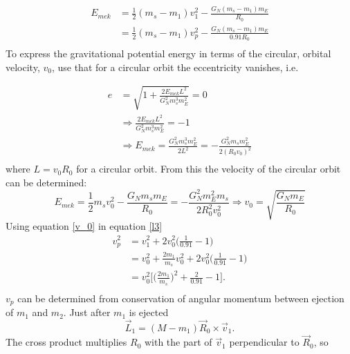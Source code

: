 \begin{example}
\begin{enumerate}
		\begin{equation}
			\begin{split}
				E_{mek}&= \frac{1}{2}(m_s-m_1)v_1^2-\frac{G_N(m_s-m_1)m_E}{R_0}\\
				&=\frac{1}{2}(m_s-m_1)v_p^2-\frac{G_N(m_s-m_1)m_E}{0.91R_0}\\
			\end{split}
			\label{l3}
		\end{equation} 
		To express the gravitational potential energy in terms of the circular, orbital velocity, $v_0$, use that for a circular orbit the eccentricity vanishes,  i.e.
		
		\begin{equation}
			\begin{split}
				e&=\sqrt{1+\frac{2E_{mek}L^2}{G_N^2m_s^3m_E^2}}=0\\
				&\Rightarrow \frac{2E_{mek}L^2}{G_N^2m_s^3m_E^2}=-1\\
				&\Rightarrow E_{mek}=\frac{G_N^2m_s^3m_E^2}{2L^2}=-\frac{G_N^2m_sm_E^2}{2(R_0v_0)^2}\\
			\end{split}
		\end{equation} 
		\normalsize
		where $L=v_0R_0$ for a circular orbit. From this the velocity of the circular orbit can be determined:
		\begin{equation}
			E_{mek}=\frac{1}{2}m_sv_0^2-\frac{G_Nm_sm_E}{R_0}=-\frac{G_N^2m_E^2m_s}{2R_0^2v_0^2}\Rightarrow v_0=\sqrt{\frac{G_Nm_E}{R_0}}
			\label{v_0}
		\end{equation} 
		Using equation \eqref{v_0} in equation \eqref{l3}
		\begin{equation}
			\begin{split}
				v_p^2&=v_1^2+2v_0^2\bigg(\frac{1}{0.91}-1\bigg)\\
				&=v_0^2+\frac{2m_1}{m_s}v_0^2+2v_0^2\bigg(\frac{1}{0.91}-1\bigg)\\
				&=v_0^2\bigg[\bigg(\frac{2m_1}{m_s}\bigg)^2+\frac{2}{0.91}-1\bigg].\\
			\end{split}
			\label{l5}
		\end{equation} 
		$v_p$ can be determined from conservation of angular momentum between ejection of $m_1$ and $m_2$. Just after $m_1$ is ejected
		\begin{equation}
			\vec{L}_1=(M-m_1)\vec{R}_0\times \vec{v}_1.
		\end{equation} 
		The cross product multiplies $R_0$ with the part of $\vec{v}_1$ perpendicular to $\vec{R}_0$, so

\end{enumerate}
\end{example}
